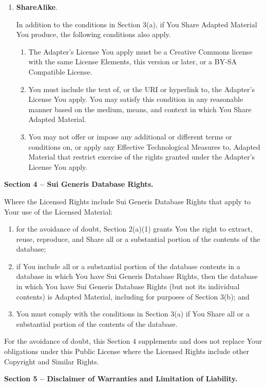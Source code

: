 \begin{enumerate}
\item \textbf{ShareAlike}.
\par In addition to the conditions in Section 3(a), if You Share Adapted Material You produce, the following conditions also apply.
\begin{enumerate}
\item The Adapter’s License You apply must be a Creative Commons license with the same License Elements, this version or later, or a BY-SA Compatible License.
\item You must include the text of, or the URI or hyperlink to, the Adapter's License You apply. You may satisfy this condition in any reasonable manner based on the medium, means, and context in which You Share Adapted Material.
\item You may not offer or impose any additional or different terms or conditions on, or apply any Effective Technological Measures to, Adapted Material that restrict exercise of the rights granted under the Adapter's License You apply.
\end{enumerate}

\end{enumerate}
\par \textbf{Section 4 – Sui Generis Database Rights.}
\par Where the Licensed Rights include Sui Generis Database Rights that apply to Your use of the Licensed Material:
\begin{enumerate}
\item for the avoidance of doubt, Section 2(a)(1) grants You the right to extract, reuse, reproduce, and Share all or a substantial portion of the contents of the database;
\item if You include all or a substantial portion of the database contents in a database in which You have Sui Generis Database Rights, then the database in which You have Sui Generis Database Rights (but not its individual contents) is Adapted Material, including for purposes of Section 3(b); and
\item You must comply with the conditions in Section 3(a) if You Share all or a substantial portion of the contents of the database.
\end{enumerate}
For the avoidance of doubt, this Section 4 supplements and does not replace Your obligations under this Public License where the Licensed Rights include other Copyright and Similar Rights.
\par \textbf{Section 5 – Disclaimer of Warranties and Limitation of Liability.}
